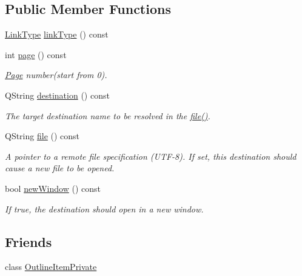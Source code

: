 \subsection*{Public Member Functions}
\begin{DoxyCompactItemize}
\item 
\hyperlink{class_mu_p_d_f_1_1_link_afdc6828b6e00f323b53d6ae36d0d06b6}{Link\-Type} \hyperlink{class_mu_p_d_f_1_1_link_goto_r_a0528b0bb75308cbad4c1ad6936daa48c}{link\-Type} () const 
\item 
int \hyperlink{class_mu_p_d_f_1_1_link_goto_r_a506a78720f51b9928517273c63470a81}{page} () const 
\begin{DoxyCompactList}\small\item\em \hyperlink{class_mu_p_d_f_1_1_page}{Page} number(start from 0). \end{DoxyCompactList}\item 
Q\-String \hyperlink{class_mu_p_d_f_1_1_link_goto_r_ab5ff953c35930b5ff57740decee8c61b}{destination} () const 
\begin{DoxyCompactList}\small\item\em The target destination name to be resolved in the \hyperlink{class_mu_p_d_f_1_1_link_goto_r_aeef07c41fa5450bf6358406011402ccd}{file()}. \end{DoxyCompactList}\item 
Q\-String \hyperlink{class_mu_p_d_f_1_1_link_goto_r_aeef07c41fa5450bf6358406011402ccd}{file} () const 
\begin{DoxyCompactList}\small\item\em A pointer to a remote file specification (U\-T\-F-\/8). If set, this destination should cause a new file to be opened. \end{DoxyCompactList}\item 
bool \hyperlink{class_mu_p_d_f_1_1_link_goto_r_a588e406a62ba86fffcc907f890342196}{new\-Window} () const 
\begin{DoxyCompactList}\small\item\em If true, the destination should open in a new window. \end{DoxyCompactList}\end{DoxyCompactItemize}
\subsection*{Friends}
\begin{DoxyCompactItemize}
\item 
class \hyperlink{class_mu_p_d_f_1_1_link_goto_r_ab008ed670017e41b6e6bba8707c775d2}{Outline\-Item\-Private}
\end{DoxyCompactItemize}
